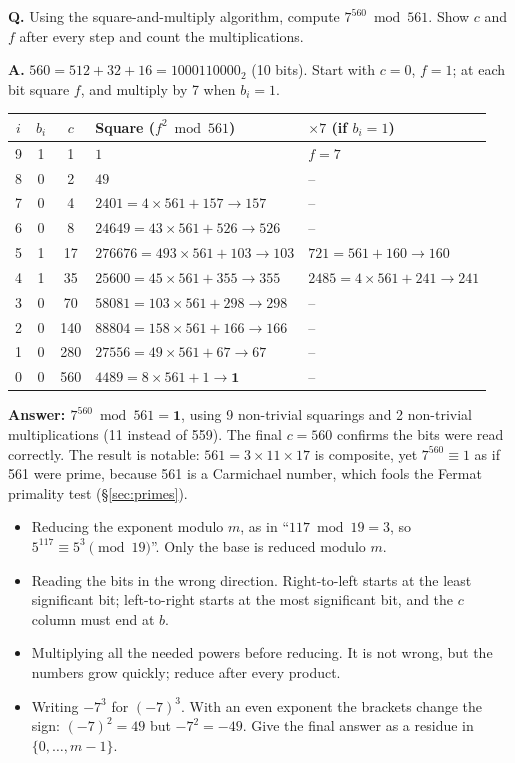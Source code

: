 \begin{worked}
\textbf{Q.} Using the square-and-multiply algorithm, compute $7^{560} \bmod 561$. Show $c$ and $f$ after every step and count the multiplications.

\textbf{A.} $560 = 512 + 32 + 16 = 1000110000_2$ (10 bits). Start with $c = 0$, $f = 1$; at each bit square $f$, and multiply by 7 when $b_i = 1$.
\begin{center}\small
\begin{tabular}{@{}cccll@{}}
\toprule
$i$ & $b_i$ & $c$ & Square ($f^2 \bmod 561$) & $\times 7$ (if $b_i = 1$)\\
\midrule
9 & 1 & 1 & $1$ & $f = 7$\\
8 & 0 & 2 & $49$ & --\\
7 & 0 & 4 & $2401 = 4 \times 561 + 157 \to 157$ & --\\
6 & 0 & 8 & $24649 = 43 \times 561 + 526 \to 526$ & --\\
5 & 1 & 17 & $276676 = 493 \times 561 + 103 \to 103$ & $721 = 561 + 160 \to 160$\\
4 & 1 & 35 & $25600 = 45 \times 561 + 355 \to 355$ & $2485 = 4 \times 561 + 241 \to 241$\\
3 & 0 & 70 & $58081 = 103 \times 561 + 298 \to 298$ & --\\
2 & 0 & 140 & $88804 = 158 \times 561 + 166 \to 166$ & --\\
1 & 0 & 280 & $27556 = 49 \times 561 + 67 \to 67$ & --\\
0 & 0 & 560 & $4489 = 8 \times 561 + 1 \to \mathbf{1}$ & --\\
\bottomrule
\end{tabular}
\end{center}
\textbf{Answer: $7^{560} \bmod 561 = \mathbf{1}$}, using 9 non-trivial squarings and 2 non-trivial multiplications (11 instead of 559). The final $c = 560$ confirms the bits were read correctly. The result is notable: $561 = 3 \times 11 \times 17$ is composite, yet $7^{560} \equiv 1$ as if 561 were prime, because 561 is a Carmichael number, which fools the Fermat primality test (\S\ref{sec:primes}).
\end{worked}

\begin{trap}
\begin{itemize}[leftmargin=1.5em]
  \item Reducing the exponent modulo $m$, as in ``$117 \bmod 19 = 3$, so $5^{117} \equiv 5^3 \pmod{19}$''. Only the base is reduced modulo $m$.
  \item Reading the bits in the wrong direction. Right-to-left starts at the least significant bit; left-to-right starts at the most significant bit, and the $c$ column must end at $b$.
  \item Multiplying all the needed powers before reducing. It is not wrong, but the numbers grow quickly; reduce after every product.
  \item Writing $-7^3$ for $(-7)^3$. With an even exponent the brackets change the sign: $(-7)^2 = 49$ but $-7^2 = -49$. Give the final answer as a residue in $\{0, \dots, m-1\}$.
\end{itemize}
\end{trap}

